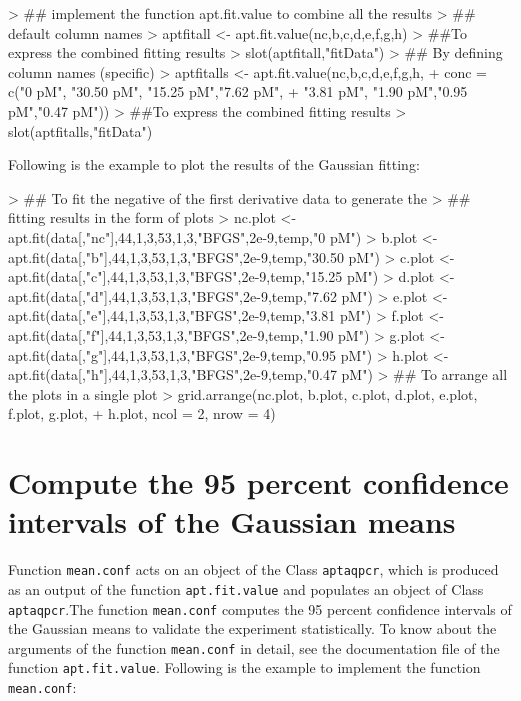 \documentclass[11pt]{article}
\newcommand{\code}[1]{{\tt #1}}
\begin{document}
\begin{Schunk}
\begin{Sinput}
> ## implement the function apt.fit.value to combine all the results
> ## default column names
> aptfitall <- apt.fit.value(nc,b,c,d,e,f,g,h)
> ##To express the combined fitting results
> slot(aptfitall,"fitData")
> ## By defining column names (specific)
> aptfitalls <- apt.fit.value(nc,b,c,d,e,f,g,h,
+ conc = c("0 pM", "30.50 pM", "15.25 pM","7.62 pM",
+          "3.81 pM", "1.90 pM","0.95 pM","0.47 pM"))
> ##To express the combined fitting results
> slot(aptfitalls,"fitData")
\end{Sinput}
\end{Schunk}

Following is the example to plot the results of the Gaussian fitting:

\begin{Schunk}
\begin{Sinput}
> ## To fit the negative of the first derivative data to generate the
> ## fitting results in the form of plots
> nc.plot <- apt.fit(data[,"nc"],44,1,3,53,1,3,"BFGS",2e-9,temp,"0 pM")
> b.plot <- apt.fit(data[,"b"],44,1,3,53,1,3,"BFGS",2e-9,temp,"30.50 pM")
> c.plot <- apt.fit(data[,"c"],44,1,3,53,1,3,"BFGS",2e-9,temp,"15.25 pM")
> d.plot <- apt.fit(data[,"d"],44,1,3,53,1,3,"BFGS",2e-9,temp,"7.62 pM")
> e.plot <- apt.fit(data[,"e"],44,1,3,53,1,3,"BFGS",2e-9,temp,"3.81 pM")
> f.plot <- apt.fit(data[,"f"],44,1,3,53,1,3,"BFGS",2e-9,temp,"1.90 pM")
> g.plot <- apt.fit(data[,"g"],44,1,3,53,1,3,"BFGS",2e-9,temp,"0.95 pM")
> h.plot <- apt.fit(data[,"h"],44,1,3,53,1,3,"BFGS",2e-9,temp,"0.47 pM")
> ## To arrange all the plots in a single plot
> grid.arrange(nc.plot, b.plot, c.plot, d.plot, e.plot, f.plot, g.plot,
+              h.plot, ncol = 2, nrow = 4)
\end{Sinput}
\end{Schunk}

\section{Compute the 95 percent confidence intervals of the Gaussian means}
Function \code{mean.conf} acts on an object of the Class \code{aptaqpcr}, which is produced as an output of the function \code{apt.fit.value} and populates an object of Class \code{aptaqpcr}.The function \code{mean.conf} computes the 95 percent confidence intervals of the Gaussian means to validate the experiment statistically. To know about the arguments of the function \code{mean.conf} in detail, see the documentation file of the function \code{apt.fit.value}. Following is the example to implement the function \code{mean.conf}:
\end{document}
